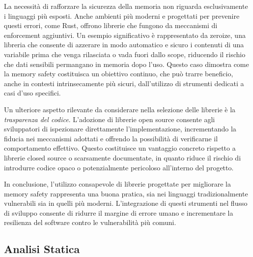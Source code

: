 La necessità di rafforzare la sicurezza della memoria non riguarda esclusivamente
i linguaggi più esposti. Anche ambienti più moderni e progettati per prevenire
questi errori, come Rust, offrono librerie che fungono da meccanismi di
enforcement aggiuntivi. Un esempio significativo è rappresentato da zeroize, una
libreria che consente di azzerare in modo automatico e sicuro i contenuti di una
variabile prima che venga rilasciata o vada fuori dallo scope, riducendo il rischio
che dati sensibili permangano in memoria dopo l'uso. Questo caso dimostra come
la memory safety costituisca un obiettivo continuo, che può trarre beneficio,
anche in contesti intrinsecamente più sicuri, dall'utilizzo di strumenti dedicati
a casi d'uso specifici.

Un ulteriore aspetto rilevante da considerare nella selezione delle librerie è la
\textit{trasparenza del codice}. L'adozione di librerie open source consente agli
sviluppatori di ispezionare direttamente l'implementazione, incrementando la fiducia
nei meccanismi adottati e offrendo la possibilità di verificarne il comportamento
effettivo. Questo costituisce un vantaggio concreto rispetto a librerie closed
source o scarsamente documentate, in quanto riduce il rischio di introdurre codice
opaco o potenzialmente pericoloso all'interno del progetto.

In conclusione, l'utilizzo consapevole di librerie progettate per migliorare la
memory safety rappresenta una buona pratica, sia nei linguaggi tradizionalmente vulnerabili
sia in quelli più moderni. L'integrazione di questi strumenti nel flusso di
sviluppo consente di ridurre il margine di errore umano e incrementare la
resilienza del software contro le vulnerabilità più comuni.

\subsection{Analisi Statica}
\label{sec:analisi-statica}
